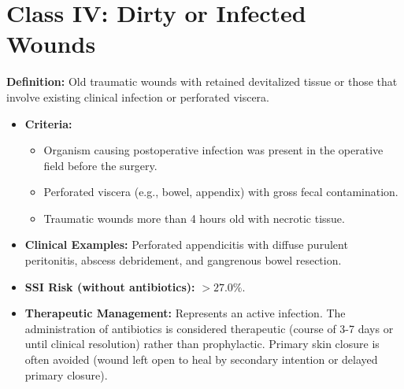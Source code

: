 \section*{Class IV: Dirty or Infected Wounds}
\textbf{Definition:} Old traumatic wounds with retained devitalized tissue or those that involve existing clinical infection or perforated viscera.
\begin{itemize}
  \item \textbf{Criteria:}
  \begin{itemize}
    \item Organism causing postoperative infection was present in the operative field before the surgery.
    \item Perforated viscera (e.g., bowel, appendix) with gross fecal contamination.
    \item Traumatic wounds more than 4 hours old with necrotic tissue.
  \end{itemize}
  \item \textbf{Clinical Examples:} Perforated appendicitis with diffuse purulent peritonitis, abscess debridement, and gangrenous bowel resection.
  \item \textbf{SSI Risk (without antibiotics):} $>27.0\%$.
  \item \textbf{Therapeutic Management:} Represents an active infection. The administration of antibiotics is considered therapeutic (course of 3-7 days or until clinical resolution) rather than prophylactic. Primary skin closure is often avoided (wound left open to heal by secondary intention or delayed primary closure).
\end{itemize}

\clearpage
